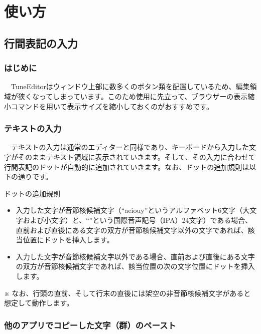 \chapter{使い方}

\section{行間表記の入力}

\subsection{はじめに}

　TuneEditorはウィンドウ上部に数多くのボタン類を配置しているため、編集領域が狭くなってしまっています。このため使用に先立って、ブラウザーの表示縮小コマンドを用いて表示サイズを縮小しておくのがおすすめです。

\subsection{テキストの入力}

　テキストの入力は通常のエディターと同様であり、キーボードから入力した文字がそのままテキスト領域に表示されていきます。そして、その入力に合わせて行間表記のドットが自動的に追加されていきます。なお、ドットの追加規則は以下の通りです。

\begin{itembox}[l]
{\textsf{ドットの追加規則}}\label{dottingRules}

\begin{itemize}
\item 入力した文字が\textsf{音節核候補文字}（``aeiouy''というアルファベット6文字（大文字および小文字）と、``{}''という国際音声記号（IPA）24文字）である場合、直前および直後にある文字の\textsf{双方}が音節核候補文字\textsf{以外}の文字であれば、該当位置にドットを挿入します。

\bigskip
\item 入力した文字が音節核候補文字\textsf{以外}である場合、直前および直後にある文字の\textsf{双方}が音節核候補文字であれば、該当位置の次の文字位置にドットを挿入します。
\end{itemize}
\bigskip
※ なお、行頭の直前、そして行末の直後には架空の\textsf{非}音節核候補文字があると想定して動作します。
\end{itembox}


\subsection{他のアプリでコピーした文字（群）のペースト}

